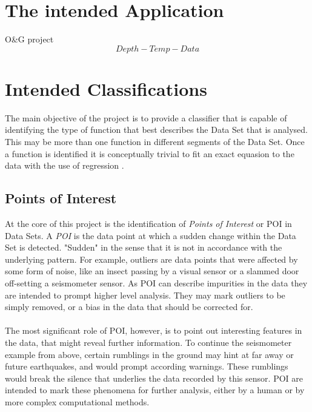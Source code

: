 \documentclass[main.tex]{subfiles}
\begin{document}
    
  \section{The intended Application}
    
    O\&G project
    \[Depth-Temp-Data\]
    
  \section{Intended Classifications}
    
    The main objective of the project is to provide a classifier that is capable of identifying the type of function that best describes the Data Set that is analysed. This may be more than one function in different segments of the Data Set. Once a function is identified it is conceptually trivial to fit an exact equasion to the data with the use of regression \cite{}. 
    
    \subsection{Points of Interest}  
      
      At the core of this project is the identification of \textit{Points of Interest} or POI in Data Sets. A \textit{POI} is the data point at which a sudden change within the Data Set is detected. "Sudden" in the sense that it is not in accordance with the underlying pattern. For example, outliers are data points that were affected by some form of noise, like an insect passing by a visual sensor or a slammed door off-setting a seismometer sensor. As POI can describe impurities in the data they are intended to prompt higher level analysis. They may mark outliers to be simply removed, or a bias in the data that should be corrected for. 
      \\\\
      The most significant role of POI, however, is to point out interesting features in the data, that might reveal further information. To continue the seismometer example from above, certain rumblings in the ground may hint at far away or future earthquakes, and would prompt according warnings. These rumblings would break the silence that underlies the data recorded by this sensor. POI are intended to mark these phenomena for further analysis, either by a human or by more complex computational methods.
      
\end{document}
